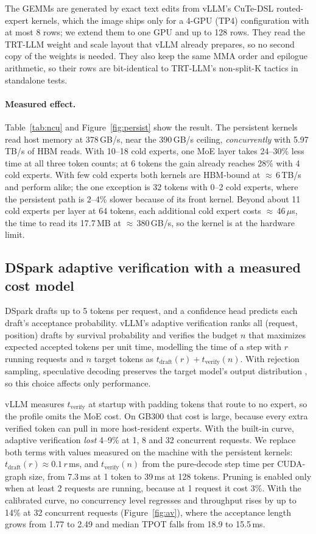 \documentclass{article}
\newcommand{\figref}[1]{Figure~\ref{#1}}
\newcommand{\tabref}[1]{Table~\ref{#1}}
\begin{document}
The GEMMs are generated by exact text edits from vLLM's CuTe-DSL \citep{cutlass} routed-expert kernels, which the image
ships only for a 4-GPU (TP4) configuration with at most 8 rows; we extend them to one GPU and up to 128 rows. They read
the TRT-LLM weight and scale layout that vLLM already prepares, so no second copy of the weights is needed. They also
keep the same MMA order and epilogue arithmetic, so their rows are bit-identical to TRT-LLM's non-split-K tactics in
standalone tests.



\paragraph{Measured effect.} \tabref{tab:ncu} and \figref{fig:persist} show the result. The persistent kernels read
host memory at 378\,GB/s, near the 390\,GB/s ceiling, \emph{concurrently} with 5.97\,TB/s of HBM reads. With 10--18 cold
experts, one MoE layer takes 24--30\% less time at all three token counts; at 6 tokens the gain already reaches 28\% with
4 cold experts. With few cold experts both kernels are HBM-bound at ${\approx}\,6$\,TB/s and perform alike; the one
exception is 32 tokens with 0--2 cold experts, where the persistent path is 2--4\% slower because of its front kernel.
Beyond about 11 cold experts per layer at 64 tokens, each additional cold expert costs ${\approx}\,46\,\mu$s, the time to
read its 17.7\,MB at ${\approx}\,380$\,GB/s, so the kernel is at the hardware limit.


\subsection{DSpark adaptive verification with a measured cost model}\label{sec:av}
DSpark \citep{dspark} drafts up to 5 tokens per request, and a confidence head predicts each draft's acceptance
probability. vLLM's adaptive verification ranks all (request, position) drafts by survival probability and verifies the
budget $n$ that maximizes expected accepted tokens per unit time, modelling the time of a step with $r$ running
requests and $n$ target tokens as $t_\text{draft}(r) + t_\text{verify}(n)$. With rejection sampling, speculative
decoding preserves the target model's output distribution \citep{specdec}, so this choice affects only performance.

vLLM measures $t_\text{verify}$ at startup with padding tokens that route to no expert, so the profile omits the MoE
cost. On GB300 that cost is large, because every extra verified token can pull in more host-resident experts. With the
built-in curve, adaptive verification \emph{lost} 4--9\% at 1, 8 and 32 concurrent requests. We replace both terms with
values measured on the machine with the persistent kernels: $t_\text{draft}(r) \approx 0.1\,r$\,ms, and
$t_\text{verify}(n)$ from the pure-decode step time per CUDA-graph size, from 7.3\,ms at 1 token to 39\,ms at 128
tokens. Pruning is enabled only when at least 2 requests are running, because at 1 request it cost 3\%. With the
calibrated curve, no concurrency level regresses and throughput rises by up to 14\% at 32 concurrent requests
(\figref{fig:av}), where the acceptance length grows from 1.77 to 2.49 and median TPOT falls from 18.9 to 15.5\,ms.
\end{document}
